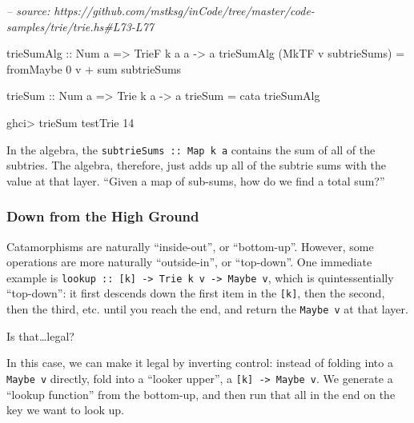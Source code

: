 \documentclass[]{article}
\newenvironment{Shaded}{}{}
\newcommand{\CommentTok}[1]{\textcolor[rgb]{0.38,0.63,0.69}{\textit{#1}}}
\newcommand{\DataTypeTok}[1]{\textcolor[rgb]{0.56,0.13,0.00}{#1}}
\newcommand{\DecValTok}[1]{\textcolor[rgb]{0.25,0.63,0.44}{#1}}
\newcommand{\FunctionTok}[1]{\textcolor[rgb]{0.02,0.16,0.49}{#1}}
\newcommand{\NormalTok}[1]{#1}
\newcommand{\OtherTok}[1]{\textcolor[rgb]{0.00,0.44,0.13}{#1}}
\begin{document}
\begin{Shaded}
\begin{Highlighting}[]
\CommentTok{-- source: https://github.com/mstksg/inCode/tree/master/code-samples/trie/trie.hs#L73-L77}

\OtherTok{trieSumAlg ::} \DataTypeTok{Num}\NormalTok{ a }\OtherTok{=>} \DataTypeTok{TrieF}\NormalTok{ k a a }\OtherTok{->}\NormalTok{ a}
\NormalTok{trieSumAlg (}\DataTypeTok{MkTF}\NormalTok{ v subtrieSums) }\FunctionTok{=}\NormalTok{ fromMaybe }\DecValTok{0}\NormalTok{ v }\FunctionTok{+}\NormalTok{ sum subtrieSums}

\OtherTok{trieSum ::} \DataTypeTok{Num}\NormalTok{ a }\OtherTok{=>} \DataTypeTok{Trie}\NormalTok{ k a }\OtherTok{->}\NormalTok{ a}
\NormalTok{trieSum }\FunctionTok{=}\NormalTok{ cata trieSumAlg}
\end{Highlighting}
\end{Shaded}

\begin{Shaded}
\begin{Highlighting}[]
\NormalTok{ghci}\FunctionTok{>}\NormalTok{ trieSum testTrie}
\DecValTok{14}
\end{Highlighting}
\end{Shaded}

In the algebra, the \texttt{subtrieSums\ ::\ Map\ k\ a} contains the sum of all
of the subtries. The algebra, therefore, just adds up all of the subtrie sums
with the value at that layer. ``Given a map of sub-sums, how do we find a total
sum?''

\hypertarget{down-from-the-high-ground}{%
\subsubsection{Down from the High Ground}\label{down-from-the-high-ground}}

Catamorphisms are naturally ``inside-out'', or ``bottom-up''. However, some
operations are more naturally ``outside-in'', or ``top-down''. One immediate
example is
\texttt{lookup\ ::\ {[}k{]}\ -\textgreater{}\ Trie\ k\ v\ -\textgreater{}\ Maybe\ v},
which is quintessentially ``top-down'': it first descends down the first item in
the \texttt{{[}k{]}}, then the second, then the third, etc. until you reach the
end, and return the \texttt{Maybe\ v} at that layer.

Is that\ldots{}legal?

In this case, we can make it legal by inverting control: instead of folding into
a \texttt{Maybe\ v} directly, fold into a ``looker upper'', a
\texttt{{[}k{]}\ -\textgreater{}\ Maybe\ v}. We generate a ``lookup function''
from the bottom-up, and then run that all in the end on the key we want to look
up.
\end{document}
